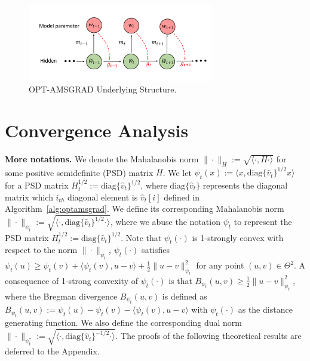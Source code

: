 \documentclass[twoside]{article}
\begin{document}
\begin{figure}[H]
\captionsetup{justification=centering}
    \vspace{-0.1in}
    \includegraphics[width=3.2in]{plots/plot.pdf}
        \vspace{-0.1in}
    \caption{\textsc{OPT-AMSGRAD} Underlying Structure.}
     \label{fig:scheme}
\end{figure}

\vspace{-0.1in}
\section{Convergence Analysis}\label{sec:analysis}
\vspace{-0.05in}

\textbf{More notations.}\hspace{0.1in}
We denote the Mahalanobis norm $\|\cdot\|_H := \sqrt{ \langle \cdot, H \cdot \rangle }$ for some positive semidefinite (PSD) matrix $H$.
We let $\psi_t(x) := \langle x, \text{diag}\{\hat{v}_t\}^{1/2} x \rangle$ for a PSD matrix $H_t^{1/2}:= \text{diag}\{\hat{v}_t\}^{1/2}$, where $\text{diag}\{\hat{v}_t\}$ represents the diagonal matrix which $i_{th}$ diagonal element is $\hat{v}_t[i]$ defined in Algorithm~\ref{alg:optamsgrad}.
We define its corresponding Mahalanobis norm $\| \cdot \|_{\psi_t}:=  \sqrt{ \langle \cdot, \text{diag}\{\hat{v}_t\}^{1/2} \cdot \rangle }$,
where we abuse the notation $\psi_t$ to represent the PSD matrix $H_t^{1/2}:=\text{diag}\{\hat{v}_t\}^{1/2}$.
Note that $\psi_t(\cdot)$ is 1-strongly convex with respect to the norm $\| \cdot \|_{\psi_t}$, \ie $\psi_t(\cdot)$ satisfies $\psi_t(u) \geq \psi_t(v) + \langle \psi_t(v), u - v \rangle + \frac{1}{2} \| u - v\|^2_{\psi_t}$ for any point $(u,v) \in \Theta^2$.
A consequence of 1-strong convexity of $\psi_t(\cdot)$ is that $B_{\psi_t}(u,v) \geq \frac{1}{2} \| u - v \|^2_{\psi_t}$, where the Bregman divergence $B_{\psi_t}(u,v)$ is defined as $B_{\psi_t}(u,v) := \psi_t(u) - \psi_t(v) - \langle \psi_t(v), u - v \rangle$ with $\psi_t(\cdot)$ as the distance generating function.
We also define the corresponding dual norm $\| \cdot \|_{\psi_t^*}:= \sqrt{ \langle \cdot, \text{diag}\{\hat{v}_t\}^{-1/2} \cdot \rangle }$.
The proofs of the following theoretical results are deferred to the Appendix.
\end{document}
